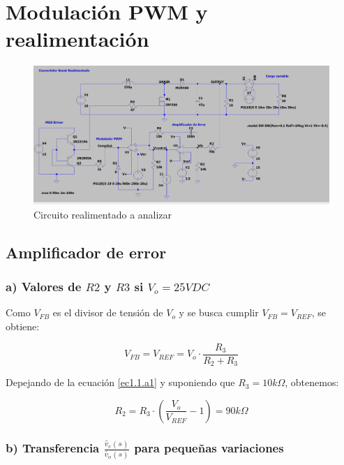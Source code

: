 \documentclass[e4_tp2_main.tex]{subfiles}
\begin{document}

\section{Modulación PWM y realimentación}

\begin{figure}[H]
\centering
\includegraphics[width=0.9\linewidth]{Imagenes/Punto1/circuito1.png}
\caption{Circuito realimentado a analizar}
\end{figure}

\subsection{Amplificador de error}

\subsubsection*{a) Valores de $R2$ y $R3$ si $V_o=25 VDC$}

Como $V_{FB}$ es el divisor de tensi\'on de $V_o$ y se busca cumplir $V_{FB}=V_{REF}$, se obtiene:

\begin{equation}
V_{FB}=V_{REF}= V_o \cdot \frac{R_3}{R_2+R_3} 
\label{ec1.1.a1}
\end{equation}


Depejando de la ecuaci\'on \eqref{ec1.1.a1} y suponiendo que $R_3=10k \Omega $, obtenemos:

\begin{equation}
R_2=R_3 \cdot \left( \frac{V_o}{V_{REF}} - 1 \right)=90k \Omega \label{ec1.1.a2}
\end{equation}

\subsubsection*{b) Transferencia  $\frac{ \widetilde{v_c}(s)}{\widetilde{v_o}(s)}$ para pequeñas variaciones} 
\end{document}
